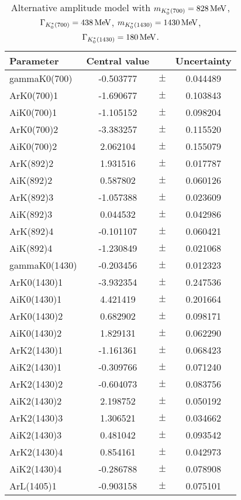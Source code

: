 \clearpage

\begin{table}
\centering
\caption{Alternative amplitude model with $m_{K^*_0(700)} = 828 \text{\,Me\kern -0.1em V}$, $\Gamma_{K^*_0(700)} = 438 \text{\,Me\kern -0.1em V}$, $m_{K^*_0(1430)} = 1430 \text{\,Me\kern -0.1em V}$, $\Gamma_{K^*_0(1430)} = 180 \text{\,Me\kern -0.1em V}$.}
\begin{tiny}
\begin{tabular}{lccc}
\toprule
Parameter & Central value & & Uncertainty\\
\midrule
gammaK0(700) & -0.503777 & $\pm$ & 0.044489 \\
ArK0(700)1 & -1.690677 & $\pm$ & 0.103843 \\
AiK0(700)1 & -1.105152 & $\pm$ & 0.098204 \\
ArK0(700)2 & -3.383257 & $\pm$ & 0.115520 \\
AiK0(700)2 & 2.062104 & $\pm$ & 0.155079 \\
ArK(892)2 & 1.931516 & $\pm$ & 0.017787 \\
AiK(892)2 & 0.587802 & $\pm$ & 0.060126 \\
ArK(892)3 & -1.057388 & $\pm$ & 0.023609 \\
AiK(892)3 & 0.044532 & $\pm$ & 0.042986 \\
ArK(892)4 & -0.101107 & $\pm$ & 0.060421 \\
AiK(892)4 & -1.230849 & $\pm$ & 0.021068 \\
gammaK0(1430) & -0.203456 & $\pm$ & 0.012323 \\
ArK0(1430)1 & -3.932354 & $\pm$ & 0.247536 \\
AiK0(1430)1 & 4.421419 & $\pm$ & 0.201664 \\
ArK0(1430)2 & 0.682902 & $\pm$ & 0.098171 \\
AiK0(1430)2 & 1.829131 & $\pm$ & 0.062290 \\
ArK2(1430)1 & -1.161361 & $\pm$ & 0.068423 \\
AiK2(1430)1 & -0.309766 & $\pm$ & 0.071240 \\
ArK2(1430)2 & -0.604073 & $\pm$ & 0.083756 \\
AiK2(1430)2 & 2.198752 & $\pm$ & 0.050192 \\
ArK2(1430)3 & 1.306521 & $\pm$ & 0.034662 \\
AiK2(1430)3 & 0.481042 & $\pm$ & 0.093542 \\
ArK2(1430)4 & 0.854161 & $\pm$ & 0.042973 \\
AiK2(1430)4 & -0.286788 & $\pm$ & 0.078908 \\
ArL(1405)1 & -0.903158 & $\pm$ & 0.075101 \\

\end{tabular}
\end{tiny}
\end{table}
